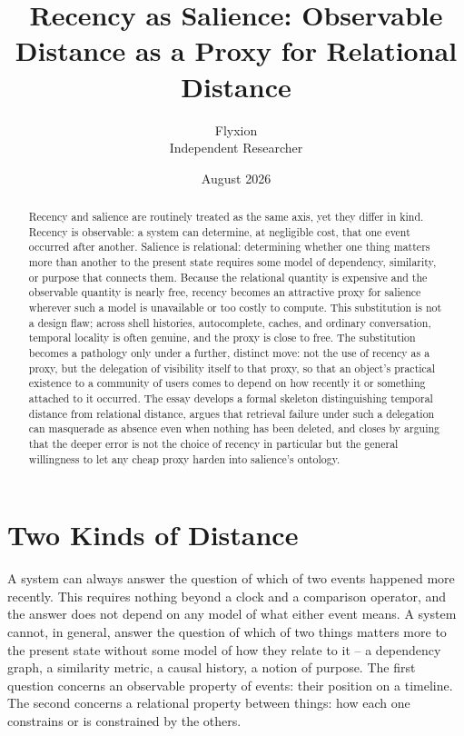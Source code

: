 \documentclass[11pt]{article}
\title{Recency as Salience: Observable Distance as a Proxy for Relational Distance}
\author{Flyxion \\ Independent Researcher}
\date{August 2026}
\begin{document}
\maketitle

\begin{abstract}
Recency and salience are routinely treated as the same axis, yet they differ in kind. Recency is observable: a system can determine, at negligible cost, that one event occurred after another. Salience is relational: determining whether one thing matters more than another to the present state requires some model of dependency, similarity, or purpose that connects them. Because the relational quantity is expensive and the observable quantity is nearly free, recency becomes an attractive proxy for salience wherever such a model is unavailable or too costly to compute. This substitution is not a design flaw; across shell histories, autocomplete, caches, and ordinary conversation, temporal locality is often genuine, and the proxy is close to free. The substitution becomes a pathology only under a further, distinct move: not the use of recency as a proxy, but the delegation of visibility itself to that proxy, so that an object's practical existence to a community of users comes to depend on how recently it or something attached to it occurred. The essay develops a formal skeleton distinguishing temporal distance from relational distance, argues that retrieval failure under such a delegation can masquerade as absence even when nothing has been deleted, and closes by arguing that the deeper error is not the choice of recency in particular but the general willingness to let any cheap proxy harden into salience's ontology.
\end{abstract}

\section{Two Kinds of Distance}

A system can always answer the question of which of two events happened more recently. This requires nothing beyond a clock and a comparison operator, and the answer does not depend on any model of what either event means. A system cannot, in general, answer the question of which of two things matters more to the present state without some model of how they relate to it -- a dependency graph, a similarity metric, a causal history, a notion of purpose. The first question concerns an observable property of events: their position on a timeline. The second concerns a relational property between things: how each one constrains or is constrained by the others.
\end{document}

